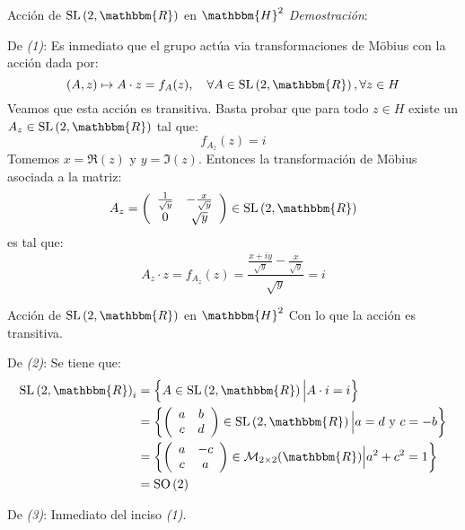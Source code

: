 \documentclass[xcolor=dvipsnames]{beamer}
\theoremstyle{largebreak}
\newcommand{\bbm}[1]{\ensuremath{\mathbbm{#1}}}
\newcommand{\SO}[1]{\ensuremath{\textup{SO}\left(#1\right)}}
\newcommand{\SL}[1]{\ensuremath{\textup{SL}\left(#1\right)}}
\begin{document}
\begin{frame}{Acción de $\SL{2,\bbm{R}}$ en $\bbm{H}^2$}
    \textit{Demostración}:

    De \textit{(1)}: Es inmediato que el grupo actúa via transformaciones de Möbius con la acción dada por:
    \begin{equation*}
        (A,z)\mapsto A\cdot z = f_A(z),\quad\forall A\in \SL{2,\bbm{R}},\forall z\in H
    \end{equation*}
    Veamos que esta acción es transitiva. Basta probar que para todo $z\in H$ existe un $A_z\in\SL{2,\bbm{R}}$ tal que:
    \begin{equation*}
        f_{A_z}(z)=i
    \end{equation*}
    Tomemos $x=\Re(z)$ y $y=\Im(z)$. Entonces la transformación de Möbius asociada a la matriz:
    \begin{equation*}
        A_z=\left(
            \begin{array}{cc}
                \frac{1}{\sqrt{y}} & -\frac{x}{\sqrt{y}} \\
                0 & \sqrt{y} \\
            \end{array}
        \right)\in\SL{2,\bbm{R}}
    \end{equation*}
    es tal que:
    \begin{equation*}
        A_z\cdot z=f_{ A_z}(z)=\frac{\frac{x+iy}{\sqrt{y}}-\frac{x}{\sqrt{y}}}{\sqrt{y}}=i
    \end{equation*}
\end{frame}

\begin{frame}{Acción de $\SL{2,\bbm{R}}$ en $\bbm{H}^2$}
    Con lo que la acción es transitiva.
    
    De \textit{(2)}: Se tiene que:
    \begin{equation*}
        \begin{split}
            \SL{2,\bbm{R}}_i&=\left\{A\in\SL{2,\bbm{R}}\Big|A\cdot i=i \right\}\\
            &=\left\{\left(\begin{array}{cc}
                a & b \\
                c & d \\
            \end{array} \right) \in\SL{2,\bbm{R}}\Big|a = d\textup{ y }c=-b \right\}\\
            &=\left\{\left(\begin{array}{cc}
                a & -c \\
                c & a \\
            \end{array} \right) \in\mathcal{M}_{2\times2}(\bbm{R}) \Big|a^2+c^2=1 \right\}\\
            &=\SO{2}\\
        \end{split}
    \end{equation*}

    De \textit{(3)}: Inmediato del inciso \textit{(1)}.
\end{frame}
\end{document}
